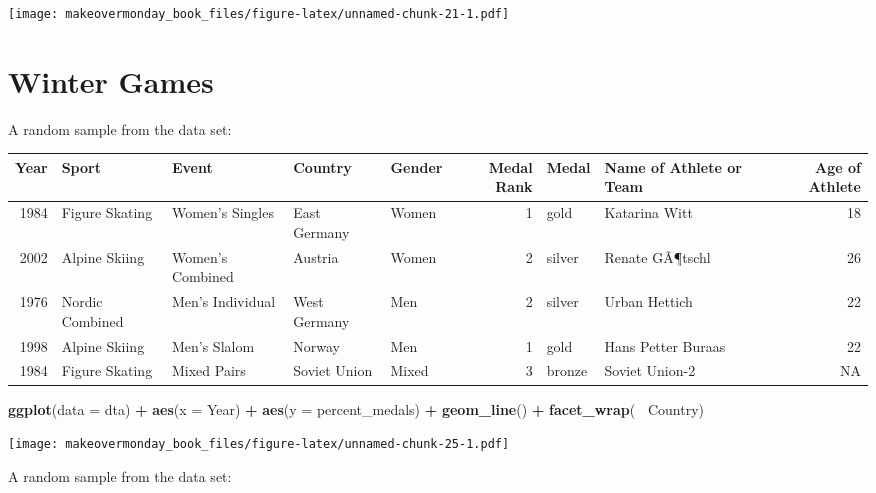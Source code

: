 \documentclass[]{book}
\newenvironment{Shaded}{\begin{snugshade}}{\end{snugshade}}
\newcommand{\KeywordTok}[1]{\textcolor[rgb]{0.13,0.29,0.53}{\textbf{#1}}}
\newcommand{\DataTypeTok}[1]{\textcolor[rgb]{0.13,0.29,0.53}{#1}}
\newcommand{\StringTok}[1]{\textcolor[rgb]{0.31,0.60,0.02}{#1}}
\newcommand{\OperatorTok}[1]{\textcolor[rgb]{0.81,0.36,0.00}{\textbf{#1}}}
\newcommand{\NormalTok}[1]{#1}
\theoremstyle{definition}
\theoremstyle{definition}
\theoremstyle{definition}
\theoremstyle{remark}
\begin{document}
\texttt{[image: makeovermonday\_book\_files/figure-latex/unnamed-chunk-21-1.pdf]}

\chapter{Winter Games}\label{winter-games}

A random sample from the data set:

\begin{tabular}{r|l|l|l|l|r|l|l|r}
\hline
Year & Sport & Event & Country & Gender & Medal Rank & Medal & Name of Athlete or Team & Age of Athlete\\
\hline
1984 & Figure Skating & Women's Singles & East Germany & Women & 1 & gold & Katarina Witt & 18\\
\hline
2002 & Alpine Skiing & Women's Combined & Austria & Women & 2 & silver & Renate GÃ¶tschl & 26\\
\hline
1976 & Nordic Combined & Men's Individual & West Germany & Men & 2 & silver & Urban Hettich & 22\\
\hline
1998 & Alpine Skiing & Men's Slalom & Norway & Men & 1 & gold & Hans Petter Buraas & 22\\
\hline
1984 & Figure Skating & Mixed Pairs & Soviet Union & Mixed & 3 & bronze & Soviet Union-2 & NA\\
\hline
\end{tabular}

\begin{Shaded}
\begin{Highlighting}[]
\KeywordTok{ggplot}\NormalTok{(}\DataTypeTok{data =}\NormalTok{ dta) }\OperatorTok{+}\StringTok{ }
\StringTok{  }\KeywordTok{aes}\NormalTok{(}\DataTypeTok{x =}\NormalTok{ Year) }\OperatorTok{+}
\StringTok{  }\KeywordTok{aes}\NormalTok{(}\DataTypeTok{y =}\NormalTok{ percent_medals) }\OperatorTok{+}
\StringTok{  }\KeywordTok{geom_line}\NormalTok{() }\OperatorTok{+}\StringTok{ }
\StringTok{  }\KeywordTok{facet_wrap}\NormalTok{(}\OperatorTok{~}\StringTok{ }\NormalTok{Country)}
\end{Highlighting}
\end{Shaded}

\texttt{[image: makeovermonday\_book\_files/figure-latex/unnamed-chunk-25-1.pdf]}

A random sample from the data set:
\end{document}
